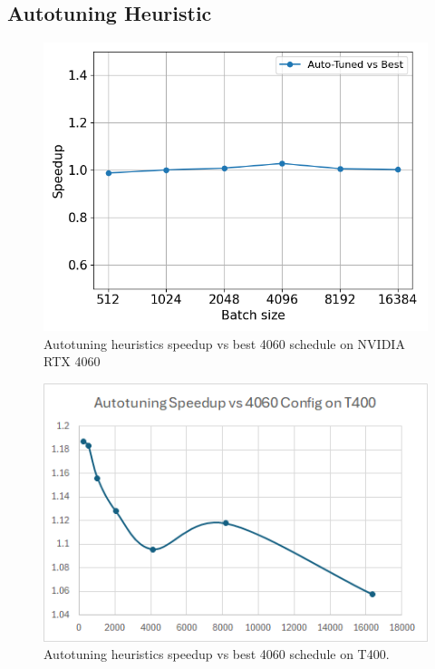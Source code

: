 \subsection{Autotuning Heuristic}
\begin{figure}[htb]
  \centering
  \includegraphics[width=0.75\linewidth]{figures/geomean_speedup_4060_best_vs_at.png}
  \caption{Autotuning heuristics speedup vs best 4060 schedule on NVIDIA RTX 4060}
  \label{Fig:AutotuningSpeedupvs4060Sched}
\end{figure}

\begin{figure}[htb]
  \centering
  \includegraphics[width=0.75\linewidth]{figures/AutotuningSpeedupvs4060Sched_T400.png}
  \caption{Autotuning heuristics speedup vs best 4060 schedule on T400.}
  \label{Fig:AutotuningSpeedupvs4060Sched_T400}
\end{figure}

